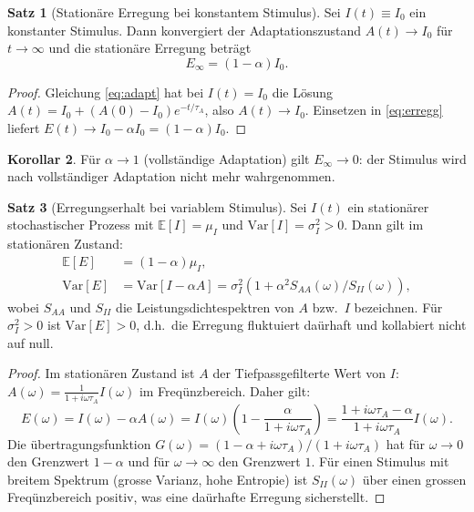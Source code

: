 ﻿\documentclass[12pt,a4paper]{article}
\theoremstyle{definition}
\newtheorem{theorem}{Satz}[section]
\newtheorem{corollary}[theorem]{Korollar}
\newcommand{\E}{\mathbb{E}}
\newcommand{\Var}{\mathrm{Var}}
\begin{document}
\begin{theorem}[Stationäre Erregung bei konstantem Stimulus]
Sei $I(t) \equiv I_0$ ein konstanter Stimulus. Dann konvergiert der
Adaptationszustand $A(t) \to I_0$ für $t \to \infty$ und die
stationäre Erregung beträgt
\[
  E_\infty = (1 - \alpha) I_0.
\]
\end{theorem}

\begin{proof}
Gleichung \eqref{eq:adapt} hat bei $I(t) = I_0$ die Lösung
$A(t) = I_0 + (A(0) - I_0)e^{-t/\tau_A}$, also $A(t) \to I_0$.
Einsetzen in \eqref{eq:erregg} liefert $E(t) \to I_0 - \alpha I_0 = (1-\alpha) I_0$.
\end{proof}

\begin{corollary}
Für $\alpha \to 1$ (vollständige Adaptation) gilt $E_\infty \to 0$:
der Stimulus wird nach vollständiger Adaptation nicht mehr wahrgenommen.
\end{corollary}

\begin{theorem}[Erregungserhalt bei variablem Stimulus]\label{thm:erregungserhalt}
Sei $I(t)$ ein stationärer stochastischer Prozess mit $\E[I] = \mu_I$
und $\Var[I] = \sigma_I^2 > 0$. Dann gilt im stationären Zustand:
\begin{align}
  \E[E] &= (1 - \alpha)\mu_I, \\
  \Var[E] &= \Var[I - \alpha A]
           = \sigma_I^2\left(1 + \alpha^2 S_{AA}(\omega) / S_{II}(\omega)\right),
\end{align}
wobei $S_{AA}$ und $S_{II}$ die Leistungsdichtespektren von $A$ bzw.\ $I$
bezeichnen. Für $\sigma_I^2 > 0$ ist $\Var[E] > 0$, d.h.\
die Erregung fluktuiert daürhaft und kollabiert nicht auf null.
\end{theorem}

\begin{proof}
Im stationären Zustand ist $A$ der Tiefpassgefilterte Wert von $I$:
$A(\omega) = \frac{1}{1 + i\omega\tau_A} I(\omega)$ im Freqünzbereich.
Daher gilt:
\[
  E(\omega) = I(\omega) - \alpha A(\omega)
  = I(\omega)\left(1 - \frac{\alpha}{1 + i\omega\tau_A}\right)
  = \frac{1 + i\omega\tau_A - \alpha}{1 + i\omega\tau_A} I(\omega).
\]
Die übertragungsfunktion $G(\omega) = (1 - \alpha + i\omega\tau_A)/(1 + i\omega\tau_A)$
hat für $\omega \to 0$ den Grenzwert $1 - \alpha$ und für
$\omega \to \infty$ den Grenzwert $1$. Für einen Stimulus mit
breitem Spektrum (grosse Varianz, hohe Entropie) ist $S_{II}(\omega)$
über einen grossen Freqünzbereich positiv, was eine daürhafte Erregung
sicherstellt.
\end{proof}
\end{document}

